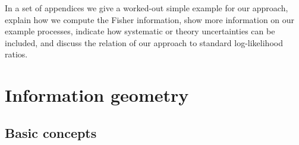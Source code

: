 In a set of appendices we give a worked-out simple example for our
approach, explain how we compute the Fisher information, show more
information on our example processes, indicate how systematic or
theory uncertainties can be included, and discuss the relation of our
approach to standard log-likelihood ratios.



\section{Information geometry}
\label{sec:information_formalism}

\subsection{Basic concepts}
\label{sec:information_formalism_information}

